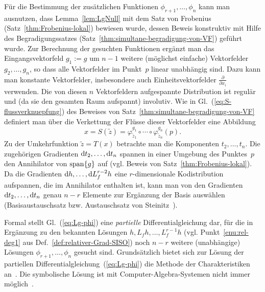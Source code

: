 \begin{remark}
\label{rem:Berechnung-Byrnes-Isidori-NF}Für die Bestimmung der zusätzlichen
Funktionen $\phi_{r+1},\ldots,\phi_{n}$ kann man ausnutzen, dass
Lemma~\ref{lem:LgNull} mit dem Satz von Frobenius (Satz~\ref{thm:Frobenius-lokal})
bewiesen wurde, dessen Beweis konstruktiv mit Hilfe des Begradigungssatzes
(Satz~\ref{thm:simultane-begradigung-von-VF}) geführt wurde. Zur
Berechnung der gesuchten Funktionen ergänzt man das Eingangsvektorfeld
$g_{1}:=g$ um $n-1$ weitere (möglichst einfache) Vektorfelder $g_{2},\ldots,g_{n}$,
so dass alle Vektorfelder im Punkt~$p$ linear unabhängig sind. Dazu
kann man konstante Vektorfelder, insbesondere auch Einheitsvektorfelder
$\tfrac{\partial}{\partial x_{i}}$ verwenden. Die von diesen $n$
Vektorfeldern aufgespannte Distribution ist regulär und (da sie den
gesamten Raum aufspannt) involutiv. Wie in Gl.~(\ref{eq:S-flussverknuepfung})
des Beweises von Satz~\ref{thm:simultane-begradigung-von-VF} definiert
man über die Verkettung der Flüsse dieser Vektorfelder eine Abbildung
\begin{equation}
x=S(\tilde{z})=\varphi_{\tilde{z}_{1}}^{g_{1}}\circ\cdots\circ\varphi_{\tilde{z}_{n}}^{g_{n}}(p).\label{eq:flussverkettung-berechnung-BINF}
\end{equation}
Zu der Umkehrfunktion $\tilde{z}=T(x)$ betrachte man die Komponenten
$t_{2},\ldots,t_{n}$. Die zugehörigen Gradienten ${\mathrm{d}} t_{2},\ldots,{\mathrm{d}} t_{n}$
spannen in einer Umgebung des Punktes~$p$ den Annihilator von ${\operatorname{span}}\{g\}$
auf (vgl. Beweis von Satz~\ref{thm:Frobenius-lokal}). Da die Gradienten
${\mathrm{d}} h,\ldots,{\mathrm{d}} L_{f}^{r-2}h$ eine $r$-dimensionale Kodistribution
aufspannen, die im Annihilator enthalten ist, kann man von den Gradienten
${\mathrm{d}} t_{2},\ldots,{\mathrm{d}} t_{n}$ genau $n-r$ Elemente zur Ergänzung der
Basis auswählen (Basis\-aus\-tausch\-satz bzw. Aus\-tausch\-satz
von Steinitz~\cite{kerner2007}).
\end{remark}

\begin{remark}
\label{rem:Berechnung-Byrnes-Isidori-NF-PDE}Formal stellt Gl.~(\ref{eq:Lg-phi})
eine \textit{partielle} Differentialgleichung dar, für die in Ergänzung
zu den bekannten Lösungen $h,L_{f}h,\ldots,L_{f}^{r-1}h$ (vgl. Punkt~\ref{enu:rel-deg1}
aus Def.~\ref{def:relativer-Grad-SISO}) noch $n-r$ weitere (unabhängige)
Lösungen $\phi_{r+1},\ldots,\phi_{n}$ gesucht sind. Grundsätzlich
bietet sich zur Lösung der partiellen Differentialgleichung~(\ref{eq:Lg-phi})
die Methode der Charakteristiken an~\cite{john1971}. Die symbolische
Lösung ist mit Computer-Algebra-Systemen nicht immer möglich~\cite{jager1991,jager95}. 
\end{remark}

